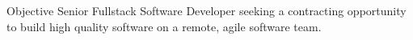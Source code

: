 \begin{section}{Objective}
  Senior Fullstack Software Developer seeking a contracting opportunity to build high quality software on a remote, agile software team.
\end{section}
